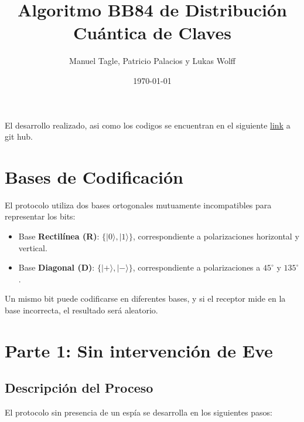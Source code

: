 \documentclass[12pt]{article}
\title{\textbf{Algoritmo BB84 de Distribución Cuántica de Claves}}
\author{Manuel Tagle, Patricio Palacios y Lukas Wolff}
\date{\today}
\begin{document}
\maketitle

El desarrollo realizado, asi como los codigos se encuentran en el siguiente \href{https://github.com/LukasWolff2002/T6_QUANTUM_MECHANICS}{link} a git hub.

\section{Bases de Codificación}
El protocolo utiliza dos bases ortogonales mutuamente incompatibles para representar los bits:
\begin{itemize}
    \item Base \textbf{Rectilínea (R)}: $\{|0\rangle, |1\rangle\}$, correspondiente a polarizaciones horizontal y vertical.
    \item Base \textbf{Diagonal (D)}: $\{|+\rangle, |-\rangle\}$, correspondiente a polarizaciones a $45^\circ$ y $135^\circ$.
\end{itemize}
Un mismo bit puede codificarse en diferentes bases, y si el receptor mide en la base incorrecta, el resultado será aleatorio.

\section{Parte 1: Sin intervención de Eve}
\subsection{Descripción del Proceso}
El protocolo sin presencia de un espía se desarrolla en los siguientes pasos:
\end{document}
